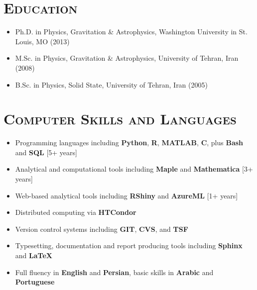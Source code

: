 \documentclass[10pt,a4paper]{moderncv}
\begin{document}
\section{\textsc{Education}}
\begin{itemize}
\item Ph.D. in Physics, Gravitation \& Astrophysics, Washington University in St. Louis, MO (2013)
\item M.Sc. in Physics, Gravitation \& Astrophysics, University of Tehran, Iran (2008)
\item B.Sc. in Physics, Solid State, University of Tehran, Iran (2005)
\end{itemize}


\section{\textsc{Computer Skills and Languages}}
\begin{itemize}
\item Programming languages including \textbf{Python}, \textbf{R}, \textbf{MATLAB}, \textbf{C}, plus \textbf{Bash} and \textbf{SQL} [5+ years]
\item Analytical and computational tools including \textbf{Maple} and \textbf{Mathematica} [3+ years]
\item Web-based analytical tools including \textbf{RShiny} and \textbf{AzureML} [1+ years]
\item Distributed computing via \textbf{HTCondor}
\item Version control systems including \textbf{GIT}, \textbf{CVS}, and \textbf{TSF}
\item Typesetting, documentation and report producing tools including \textbf{Sphinx} and \textbf{\LaTeX}
\vspace{.2cm}
\item Full fluency in \textbf{English} and \textbf{Persian}, basic skills in \textbf{Arabic} and \textbf{Portuguese}
\end{itemize}
\end{document}

